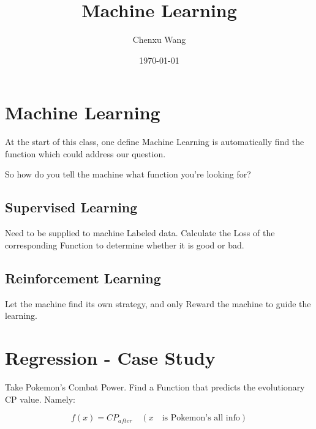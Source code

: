 \documentclass{article}
\title{\textbf{{Machine Learning}}}
\author{Chenxu Wang}
\date{\today}
\newenvironment{colblock}[1][\textbf{Collary}]{\begin{tcolorbox}[colback=JungleGreen!10!Cerulean!15,colframe=CornflowerBlue!60!Black,title = \textbf{#1}]}{\end{tcolorbox}}
\begin{document}
\maketitle

\section{Machine Learning}

\begin{colblock}[Definition of Machine Learning]
    At the start of this class, one define Machine Learning is automatically find the function which could address our question.
\end{colblock}

So how do you tell the machine what function you're looking for?

\subsection{Supervised Learning}

Need to be supplied to machine Labeled data. Calculate the Loss of the corresponding Function to determine whether it is good or bad.

\subsection{Reinforcement Learning}


Let the machine find its own strategy, and only Reward the machine to guide the learning.

\section{Regression - Case Study}


Take Pokemon's Combat Power. Find a Function that predicts the evolutionary CP value. Namely:

$$
f(x)=CP_{after}\quad (x \quad \text{is Pokemon's all info})
$$
\end{document}
